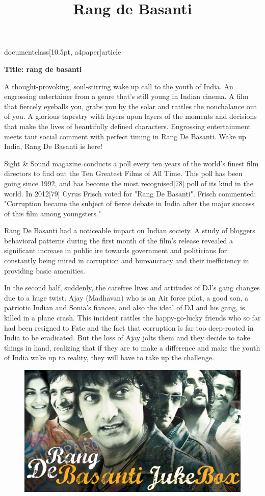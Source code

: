 documentclass[10.5pt, a4paper]{article}
\usepackage{amsfonts}
\usepackage[top=1in,left=1in,right=1in]{geometry}
\usepackage{times}
\usepackage{tabularx}
\usepackage{graphicx}
\title{Rang de Basanti}

\maketitle
\textbf{Title: rang de basanti}

A thought-provoking, soul-stirring wake up call to the youth of India. An engrossing entertainer from a genre
 that's still young in Indian cinema. A film that fiercely eyeballs you, grabs you by the solar and rattles the
 nonchalance out of you. A glorious tapestry with layers upon layers of the moments and decisions that make the
 lives of beautifully defined characters. Engrossing entertainment meets taut social comment with perfect timing
 in Rang De Basanti. Wake up India, Rang De Basanti is here!

Sight & Sound magazine conducts a poll every ten years of the world's finest film directors to find out the Ten Greatest Films of All Time. This poll has been going since 1992, and has become the most recognised[78] poll of its kind in the world. In 2012[79] Cyrus Frisch voted for "Rang De Basanti". Frisch commented: "Corruption became the subject of fierce debate in India after the major success of this film among youngsters."

Rang De Basanti had a noticeable impact on Indian society. A study of bloggers behavioral patterns during the first month of the film's release revealed a significant increase in public ire towards government and politicians for constantly being mired in corruption and bureaucracy and their inefficiency in providing basic amenities. 

In the second half, suddenly, the carefree lives and attitudes of DJ's gang changes due to a huge twist. 
Ajay (Madhavan) who is an Air force pilot, a good son, a patriotic Indian and Sonia's fiancee, and also 
the ideal of DJ and his gang, is killed in a plane crash. This incident rattles the happy-go-lucky friends 
who so far had been resigned to Fate and the fact that corruption is far too deep-rooted in India to be eradicated. 
But the loss of Ajay jolts them and they decide to take things in hand, realizing that 
if they are to make a difference and make the youth of India wake up to reality, they will have to take up the challenge.

\begin{figure}
\includegraphics{pic.jpg}
\end{figure}

